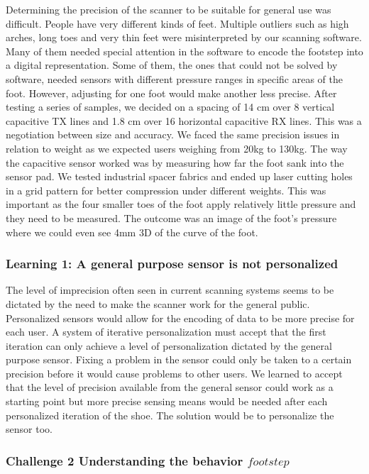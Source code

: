 Determining the precision of the scanner to be suitable for general use was difficult. People have very different kinds of feet. Multiple outliers such as high arches, long toes and very thin feet were misinterpreted by our scanning software. Many of them needed special attention in the software to encode the footstep into a digital representation.  Some of them, the ones that could not be solved by software, needed sensors with different pressure ranges in specific areas of the foot. However, adjusting for one foot would make another less precise.  
After testing a series of samples, we decided on a spacing of 14 cm over 8 vertical capacitive TX lines and 1.8 cm over 16 horizontal capacitive RX lines. This was a negotiation between size and accuracy. We faced the same precision issues in relation to weight as we expected users weighing from 20kg to 130kg. The way the capacitive sensor worked was by measuring how far the foot sank into the sensor pad.  We tested industrial spacer fabrics and ended up laser cutting holes in a grid pattern for better compression under different weights. This was important as the four smaller toes of the foot apply relatively little pressure and they need to be measured.  The outcome was an image of the foot's pressure where we could even see 4mm 3D of the curve of the foot. 


\subsubsection{Learning 1: A general purpose sensor is not personalized}

The level of imprecision often seen in current scanning systems seems to be dictated by the need to make the scanner work for the general public. Personalized sensors would allow for the encoding of data to be more precise for each user. A system of iterative personalization must accept that the first iteration can only achieve a level of personalization dictated by the general purpose sensor. Fixing a problem in the sensor could only be taken to a certain precision before it would cause problems to other users. We learned to accept that the level of precision available from the general sensor could work as a starting point but more precise sensing means would be needed after each personalized iteration of the shoe. The solution would be to personalize the sensor too.

\subsubsection{Challenge 2 Understanding the behavior \(footstep\)}

